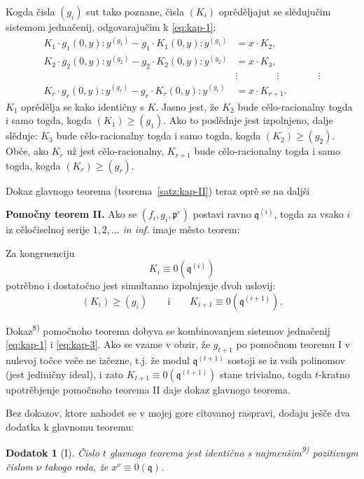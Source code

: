 \documentclass[11pt]{article}
\theoremstyle{plain}
\newtheorem{zusatz}{Dodatok}
\begin{document}
Kogda čisla $(g_{i})$ sut tako poznane, čisla $(K_{i})$ oprěděljajut
se slědujučim sistemom jednačenij, odgovarajučim k \eqref{eq:kap-1}:
\begin{equation}\label{eq:kap-3}
\begin{aligned}
K_{1}\cdot g_{1}(0,y):y^{(g_{1})} - g_{1}\cdot K_{1}(0,y):y^{(g_{1})} &= x\cdot K_{2},\\
K_{2}\cdot g_{2}(0,y):y^{(g_{2})} - g_{2}\cdot K_{2}(0,y):y^{(g_{2})} &= x\cdot K_{3},\\
&\vdots \qquad\qquad\vdots\qquad\qquad\vdots\\
K_{r}\cdot g_{r}(0,y):y^{(g_{r})} - g_{r}\cdot K_{r}(0,y):y^{(g_{r})} &= x\cdot K_{r+1}.
\end{aligned}
\end{equation}
$K_{1}$ oprědělja se kako identičny s $K$. Jasno jest, že $K_{2}$
bude cělo-racionalny togda i samo togda, kogda
$(K_{1}) \geq (g_{1})$. Ako to poslědnje jest izpolnjeno, dalje
slěduje: $K_{3}$ bude cělo-racionalny togda i samo togda, kogda
$(K_{2}) \geq (g_{2})$. Obče, ako $K_{r}$ už jest cělo-racionalny,
$K_{r+1}$ bude cělo-racionalny togda i samo togda, kogda
$(K_{r}) \geq (g_{r})$.

Dokaz glavnogo teorema (teorema~\ref{satz:kap-II}) teraz oprě se na
daljši

\smallskip
\textbf{Pomočny teorem II.} Ako se
$(f_{i}, g_{i}, \mathfrak{p}^{e})$ postavi ravno
$\mathfrak{q}^{(i)}$, togda za vsako $i$ iz cěločiselnoj serije
$1, 2, \ldots$ \textit{in inf.} imaje město teorem:

Za kongruenciju
\[
K_{i} \equiv 0(\mathfrak{q}^{(i)})
\]
potrěbno i dostatočno jest simultanno izpolnjenje dvoh uslovij:
\[
(K_{i}) \geq (g_{i}) \qquad \text{i} \qquad K_{i+1} \equiv 0(\mathfrak{q}^{(i+1)}).
\]

Dokaz\textsuperscript{8)} pomočnoho teorema dobyva se kombinovanjem
sistemov jednačenij \eqref{eq:kap-1} i \eqref{eq:kap-3}. Ako se
vzame v obzir, že $g_{t+1}$ po pomočnom teoremu I v nulevoj točce veče ne
izčezne, t.j. že modul $\mathfrak{q}^{(t+1)}$ sostoji se iz vsih
polinomov (jest jediničny ideal), i zato
$K_{t+1} \equiv 0(\mathfrak{q}^{(t+1)})$ stane trivialno, togda
$t$-kratno upotrěbjenje pomočnoho teorema II daje dokaz glavnogo
teorema.

\smallskip
Bez dokazov, ktore nahodet se v mojej gore citovanoj raspravi,
dodaju ješče dva dodatka k glavnomu teoremu:

\begin{zusatz}[I]
Čislo $t$ glavnogo teorema jest identično s najmenšim\textsuperscript{9)}
pozitivnym čislom $\nu$ takogo roda, že
$x^{\nu} \equiv 0(\mathfrak{q})$.
\end{zusatz}
\end{document}
